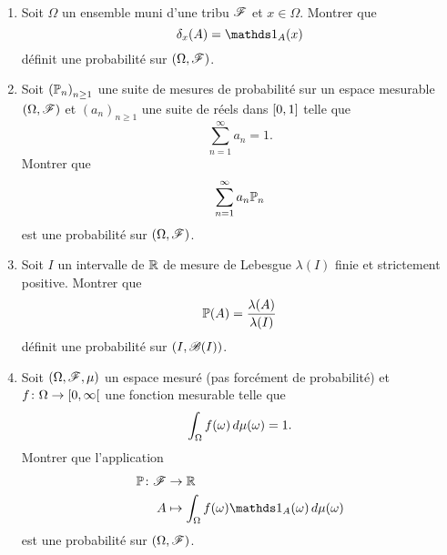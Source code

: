 \begin{td-exo}[]\, %
    \begin{enumerate}
        \item Soit \(\Omega\) un ensemble muni d'une tribu \(\mathscr{F}\) et 
        \(x\in\Omega\). Montrer que
        \begin{equation*}
            \delta_x(A) = \one_A(x)
        \end{equation*}
        définit une probabilité sur \((\Omega,\mathscr{F})\).

        \item Soit \({(\mathbb{P}_n)}_{n\ge 1}\) une suite de mesures
        de probabilité sur un espace mesurable \((\Omega,\mathscr{F})\) et
        \({(a_n)}_{n\ge 1}\) une suite de réels dans \(\mathopen{}\left[0,1\right]\mathclose{}\) telle que
        \begin{equation*}
            \sum_{n=1}^{\infty} a_n = 1.
        \end{equation*}
        Montrer que
        \begin{equation*}
            \sum_{n=1}^{\infty} a_n \mathbb{P}_n
        \end{equation*}
        est une probabilité sur \((\Omega,\mathscr{F})\).

        \item Soit \(I\) un intervalle de \(\mathbb{R}\) de mesure de Lebesgue
        \(\lambda(I)\) finie et strictement positive. Montrer que
        \begin{equation*}
            \mathbb{P}(A) = \frac{\lambda(A)}{\lambda(I)}
        \end{equation*}
        définit une probabilité sur \((I,\mathscr{B}(I))\).

        \item Soit \((\Omega,\mathscr{F},\mu)\) un espace mesuré (pas forcément
        de probabilité) et \(f\colon \Omega\to\mathopen{}\left[0,\infty\right[\mathclose{}\) une fonction
        mesurable telle que
        \begin{equation*}
            \int_{\Omega} f(\omega) \mathop{}\!{d}\mu(\omega) = 1.
        \end{equation*}
        Montrer que l'application
        \begin{equation*}
            \begin{aligned}
                \bb P\colon \scr F &\to \bb R\\
                A &\mapsto \int_{\Omega} f(\omega) \one_A(\omega) \der\mu(\omega)
            \end{aligned}
        \end{equation*}
        est une probabilité sur \((\Omega,\mathscr{F})\).
    \end{enumerate}
\end{td-exo}
